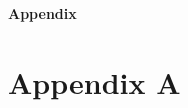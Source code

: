 \begin{center}
	\bigskip \bigskip \bigskip \bigskip
	{\huge \bf Appendix} \\
	\bigskip \bigskip
\end{center}

\section{Appendix A}